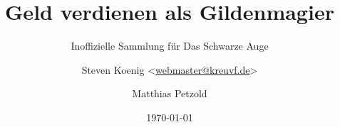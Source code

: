 \title{Geld verdienen als Gildenmagier}
\subtitle{Inoffizielle Sammlung für Das Schwarze Auge}
\author{Steven Koenig <\href{mailto:webmaster@kreuvf.de}{webmaster@kreuvf.de}> \and Matthias Petzold}
\date{\today}
\maketitle
